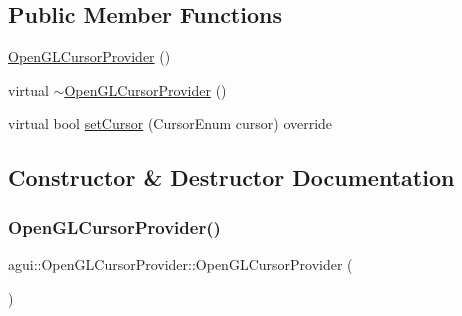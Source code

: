 \subsection*{Public Member Functions}
\begin{DoxyCompactItemize}
\item 
\mbox{\hyperlink{classagui_1_1_open_g_l_cursor_provider_a7f36c46d16e8f5dce228dc820f9aecbf}{Open\+G\+L\+Cursor\+Provider}} ()
\item 
virtual \mbox{\hyperlink{classagui_1_1_open_g_l_cursor_provider_aea2473c8af999553def7a4ccf86dac9a}{$\sim$\+Open\+G\+L\+Cursor\+Provider}} ()
\item 
virtual bool \mbox{\hyperlink{classagui_1_1_open_g_l_cursor_provider_a1a01c10c941263b5deaf339a86c80b31}{set\+Cursor}} (Cursor\+Enum cursor) override
\end{DoxyCompactItemize}


\subsection{Constructor \& Destructor Documentation}
\mbox{\label{classagui_1_1_open_g_l_cursor_provider_a7f36c46d16e8f5dce228dc820f9aecbf}} 
\subsubsection{\texorpdfstring{Open\+G\+L\+Cursor\+Provider()}{OpenGLCursorProvider()}}
{\footnotesize\ttfamily agui\+::\+Open\+G\+L\+Cursor\+Provider\+::\+Open\+G\+L\+Cursor\+Provider (\begin{DoxyParamCaption}{ }\end{DoxyParamCaption})}

\mbox{\label{classagui_1_1_open_g_l_cursor_provider_aea2473c8af999553def7a4ccf86dac9a}} 
